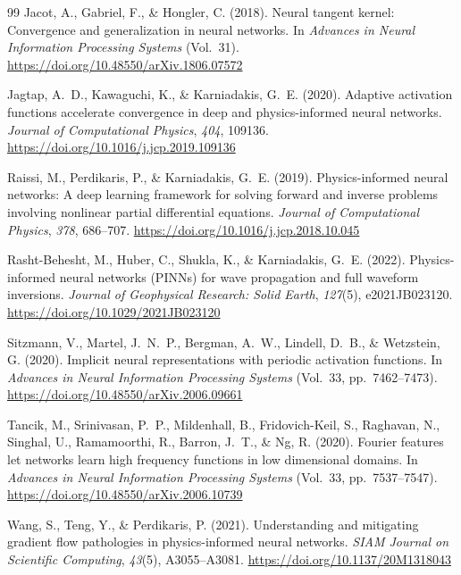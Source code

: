 \documentclass[11pt, letterpaper]{article}
\begin{document}
\begin{thebibliography}{99}
Jacot, A., Gabriel, F., \& Hongler, C. (2018).
Neural tangent kernel: Convergence and generalization in neural networks.
In \textit{Advances in Neural Information Processing Systems} (Vol.~31).
\url{https://doi.org/10.48550/arXiv.1806.07572}

Jagtap, A.~D., Kawaguchi, K., \& Karniadakis, G.~E. (2020).
Adaptive activation functions accelerate convergence in deep and physics-informed neural networks.
\textit{Journal of Computational Physics}, \textit{404}, 109136.
\url{https://doi.org/10.1016/j.jcp.2019.109136}

Raissi, M., Perdikaris, P., \& Karniadakis, G.~E. (2019).
Physics-informed neural networks: A deep learning framework for solving forward and inverse problems involving nonlinear partial differential equations.
\textit{Journal of Computational Physics}, \textit{378}, 686--707.
\url{https://doi.org/10.1016/j.jcp.2018.10.045}

Rasht-Behesht, M., Huber, C., Shukla, K., \& Karniadakis, G.~E. (2022).
Physics-informed neural networks (PINNs) for wave propagation and full waveform inversions.
\textit{Journal of Geophysical Research: Solid Earth}, \textit{127}(5), e2021JB023120.
\url{https://doi.org/10.1029/2021JB023120}

Sitzmann, V., Martel, J.~N.~P., Bergman, A.~W., Lindell, D.~B., \& Wetzstein, G. (2020).
Implicit neural representations with periodic activation functions.
In \textit{Advances in Neural Information Processing Systems} (Vol.~33, pp.~7462--7473).
\url{https://doi.org/10.48550/arXiv.2006.09661}

Tancik, M., Srinivasan, P.~P., Mildenhall, B., Fridovich-Keil, S., Raghavan, N., Singhal, U., Ramamoorthi, R., Barron, J.~T., \& Ng, R. (2020).
Fourier features let networks learn high frequency functions in low dimensional domains.
In \textit{Advances in Neural Information Processing Systems} (Vol.~33, pp.~7537--7547).
\url{https://doi.org/10.48550/arXiv.2006.10739}

Wang, S., Teng, Y., \& Perdikaris, P. (2021).
Understanding and mitigating gradient flow pathologies in physics-informed neural networks.
\textit{SIAM Journal on Scientific Computing}, \textit{43}(5), A3055--A3081.
\url{https://doi.org/10.1137/20M1318043}

\end{thebibliography}
\end{document}
